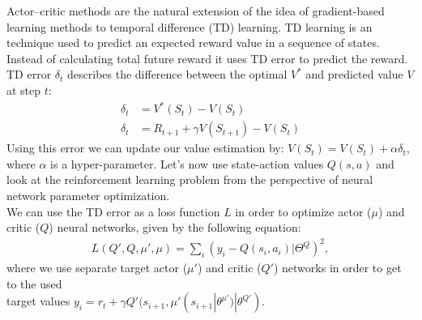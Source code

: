 \documentclass{article}
\begin{document}
Actor–critic methods are the natural extension of the idea of gradient-based learning methods to temporal difference (TD) learning. TD learning is an technique used to predict an expected reward value in a sequence of states. Instead of calculating total future reward it uses TD error to predict the reward. TD error $\delta_t$ describes the difference between the optimal $V^*$ and predicted value $V$ at step $t$:
\begin{align}
    \delta_t &= V^*(S_{t}) - V(S_t) \\
    \delta_t &= R_{t+1} + \gamma V(S_{t+1}) - V(S_t)
\end{align}
Using this error we can update our value estimation by: $V(S_t) = V(S_t) + \alpha \delta_t$, where $\alpha$ is a hyper-parameter.
\newline
Let's now use state-action values $Q(s, a)$ and look at the reinforcement learning problem from the perspective of neural network parameter optimization.\\
We can use the TD error as a loss function $L$ in order to optimize actor ($\mu$) and critic ($Q$) neural networks, given by the following equation:
\begin{align}
    L(Q', Q, \mu', \mu) = \sum_i (y_i - Q(s_i,a_i) | \Theta^Q)^2,
\end{align}
where we use separate target actor ($\mu'$) and critic ($Q'$) networks in order to get to the used\\
target values $y_i = r_t + \gamma Q'(s_{i+1}, \mu'(s_{i+1} | \theta^{\mu'}) | \theta^{Q'})$.
\end{document}
